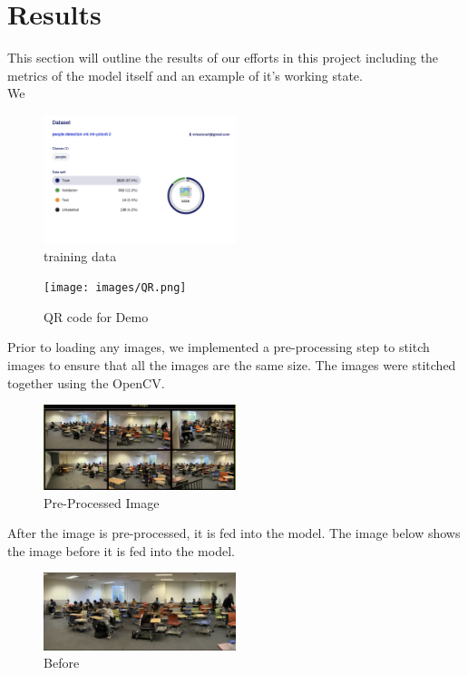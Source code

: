 \section{Results}
\label{sec:results}

This section will outline the results of our efforts in this project including the metrics of the model itself and an example of it's working state. \\

We
\begin{figure}[h]
    \centering
    \includegraphics[width=0.5\textwidth]{images/train.png}
    \caption{training data}
    \label{fig:data}
\end{figure}

\begin{figure}[h]
    \centering
    \texttt{[image: images/QR.png]}
    \caption{QR code for Demo}
    \label{fig:data}
\end{figure}

Prior to loading any images, we implemented a pre-processing step to stitch images to ensure that all the images are the same size. The images were stitched together using the OpenCV. \\
\begin{figure}[h]
    \centering
    \includegraphics[width=0.5\textwidth]{images/Pre.png}
    \caption{Pre-Processed Image}
    \label{fig:before}
\end{figure}

After the image is pre-processed, it is fed into the model. The image below shows the image before it is fed into the model. \\
\begin{figure}[h]
    \centering
    \includegraphics[width=0.5\textwidth]{images/Before.png}
    \caption{Before}
    \label{fig:before}
\end{figure}

